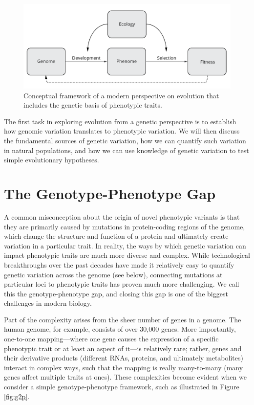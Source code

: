 \documentclass[
]{book}
\begin{document}
\begin{figure}
\includegraphics[width=1\linewidth]{images/g2p2} \caption{Conceptual framework of a modern perspective on evolution that includes the genetic basis of phenotypic traits.}\label{fig:beyondphenotype}
\end{figure}

The first task in exploring evolution from a genetic perspective is to establish how genomic variation translates to phenotypic variation. We will then discuss the fundamental sources of genetic variation, how we can quantify such variation in natural populations, and how we can use knowledge of genetic variation to test simple evolutionary hypotheses.

\hypertarget{the-genotype-phenotype-gap}{%
\section{The Genotype-Phenotype Gap}\label{the-genotype-phenotype-gap}}

A common misconception about the origin of novel phenotypic variants is that they are primarily caused by mutations in protein-coding regions of the genome, which change the structure and function of a protein and ultimately create variation in a particular trait. In reality, the ways by which genetic variation can impact phenotypic traits are much more diverse and complex. While technological breakthroughs over the past decades have made it relatively easy to quantify genetic variation across the genome (see below), connecting mutations at particular loci to phenotypic traits has proven much more challenging. We call this the genotype-phenotype gap, and closing this gap is one of the biggest challenges in modern biology.

Part of the complexity arises from the sheer number of genes in a genome. The human genome, for example, consists of over 30,000 genes. More importantly, one-to-one mapping---where one gene causes the expression of a specific phenotypic trait or at least an aspect of it---is relatively rare; rather, genes and their derivative products (different RNAs, proteins, and ultimately metabolites) interact in complex ways, such that the mapping is really many-to-many (many genes affect multiple traits at ones). These complexities become evident when we consider a simple genotype-phenotype framework, such as illustrated in Figure \ref{fig:g2p}.
\end{document}
